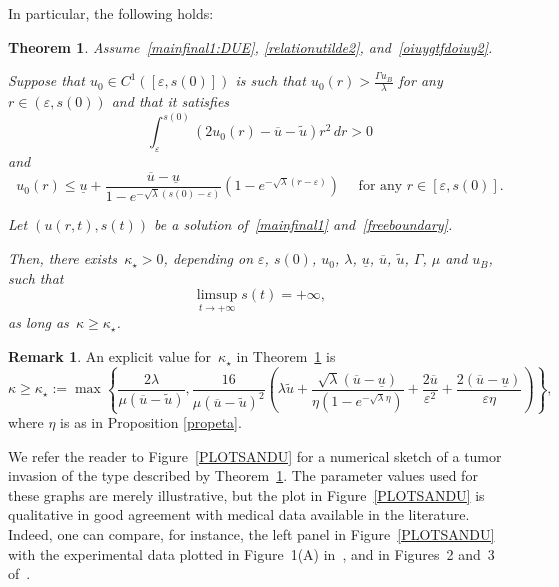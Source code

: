 \documentclass[12pt,a4paper,intlimits,sumlimits]{amsart}
\theoremstyle{definition}
\newtheorem{remark}[definition]{Remark}
\theoremstyle{plain}
\newtheorem{theorem}[definition]{Theorem}
\numberwithin{equation}{section}
\renewcommand{\le}{\leqslant}
\renewcommand{\ge}{\geqslant}
\begin{document}
In particular, the following holds:
\begin{theorem}\label{main2} Assume~\eqref{mainfinal1:DUE},
\eqref{relationutilde2}, and~\eqref{oiuygtfdoiuy2}.

Suppose that $u_0\in C^1([\varepsilon, s(0)])$ is such that $u_0(r)>\frac{\Gamma u_B}{\lambda}$ for any $r\in(\varepsilon, s(0))$ and that it satisfies
\begin{equation}\label{ctfyivgoubhjklmò,2}
\int_\varepsilon^{s(0)} (2 u_0(r)-\overline{u} -\widetilde u) r^2\, dr>0
\end{equation}
and
\begin{equation}\label{lpko,mijnhugyftcdrxctfvl,ò}
 u_0(r) \le\underline u +\dfrac{\overline u-\underline u}{1-e^{-\sqrt\lambda (s(0)-\varepsilon)}}\left(1-e^{-\sqrt\lambda(r-\varepsilon)}\right) \quad\mbox{ for any } r\in [\varepsilon, s(0)].
\end{equation}

Let $(u(r,t), s(t))$ be a solution of~\eqref{mainfinal1} and~\eqref{freeboundary}. 

Then, there exists~$\kappa_\star>0$, depending on $\varepsilon$, $s(0)$,
$u_0$, $\lambda$, $\underline u$, $\overline u$,
$\widetilde u$, $\Gamma$, $\mu$ and $u_B$,
such that
\[
\limsup_{t\to +\infty} s(t) =+\infty,
\]as long as~$\kappa\ge\kappa_\star$.
\end{theorem}

\begin{remark} An explicit value for~$\kappa_\star$
in Theorem~\ref{main2} is
\begin{equation}\label{kopfweoiojiwavnjbhin}
\kappa\ge\kappa_\star:=\max\left\{\dfrac{2\lambda}{\mu(\overline u-\widetilde u)}, \frac{16}{\mu(\overline u-\widetilde u)^2}\left(\lambda\widetilde u +\dfrac{\sqrt\lambda(\overline u-\underline u)}{\eta(1-e^{-\sqrt\lambda \eta})}+\frac{2\overline u}{\varepsilon^2}+\dfrac{2(\overline u -\underline u)}{\varepsilon\eta}\right)\right\},
\end{equation}
where $\eta$ is as in Proposition \ref{propeta}.
\end{remark}

We refer the reader to Figure~\ref{PLOTSANDU} for a numerical sketch of a tumor invasion of the type described by Theorem~\ref{main2}.  The parameter values used 
for these graphs are merely illustrative,
but the plot in Figure~\ref{PLOTSANDU} is qualitative in good agreement with medical data available in the literature. Indeed, one can compare, for instance, the left panel in Figure~\ref{PLOTSANDU} with the experimental data plotted in Figure~1(A) in~\cite{SILVO},  and
in Figures~2 and~3 of~\cite{SCHIK}.
\end{document}
